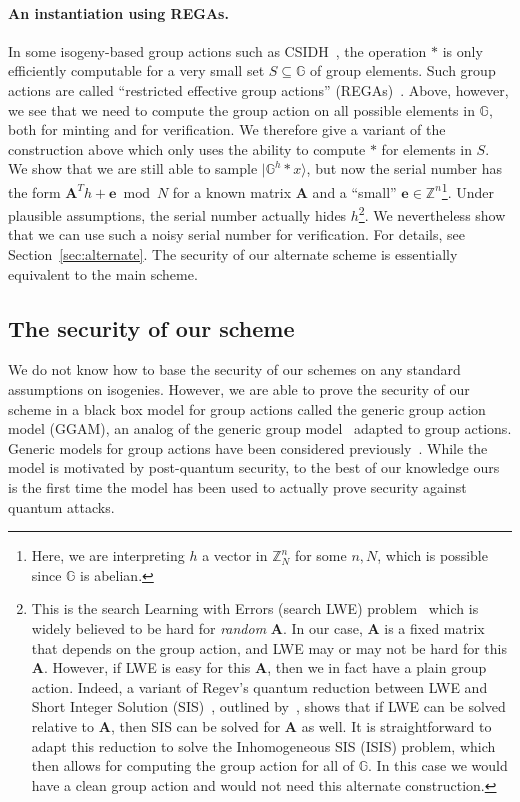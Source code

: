 \documentclass{article}\usepackage[a4paper,margin=20mm]{geometry}
\numberwithin{theorem}{section}
\numberwithin{equation}{section}
\newcommand{\Z}{\mathbb{Z}}
\newcommand{\G}{\mathbb{G}}
\newcommand{\ev}{{\mathbf{e}}}
\newcommand{\Am}{{\mathbf{A}}}
\begin{document}
\paragraph{An instantiation using REGAs.} In some isogeny-based group actions such as CSIDH~\cite{AC:CLMPR18}, the operation $*$ is only efficiently computable for a very small set $S\subseteq\G$ of group elements. Such group actions are called ``restricted effective group actions'' (REGAs)~\cite{AC:ADMP20}. Above, however, we see that we need to compute the group action on all possible elements in $\G$, both for minting and for verification. We therefore give a variant of the construction above which only uses the ability to compute $*$ for elements in $S$. We show that we are still able to sample $|\G^h*x\rangle$, but now the serial number has the form $\Am^T h+\ev\bmod N$ for a known matrix $\Am$ and a ``small'' $\ev\in\Z^n$\enspace\footnote{Here, we are interpreting $h$ a vector in $\Z_N^n$ for some $n,N$, which is possible since $\G$ is abelian.}. Under plausible assumptions, the serial number actually hides $h$\enspace\footnote{This is the search Learning with Errors (search LWE) problem~\cite{DBLP:journals/jacm/Regev09} which is widely believed to be hard for \emph{random} $\Am$. In our case, $\Am$ is a fixed matrix that depends on the group action, and LWE may or may not be hard for this $\Am$. However, if LWE is easy for this $\Am$, then we in fact have a plain group action. Indeed, a variant of Regev's quantum reduction between LWE and Short Integer Solution (SIS)~\cite{DBLP:journals/jacm/Regev09}, outlined by~\cite{DBLP:journals/joc/Zhandry21}, shows that if LWE can be solved relative to $\Am$, then SIS can be solved for $\Am$ as well. It is straightforward to adapt this reduction to solve the Inhomogeneous SIS (ISIS) problem, which then allows for computing the group action for all of $\G$. In this case we would have a clean group action and would not need this alternate construction.}. We nevertheless show that we can use such a noisy serial number for verification. For details, see Section~\ref{sec:alternate}. The security of our alternate scheme is essentially equivalent to the main scheme.



\subsection{The security of our scheme}\label{sec:introsec}

We do not know how to base the security of our schemes on any standard assumptions on isogenies. However, we are able to prove the security of our scheme in a black box model for group actions called the generic group action model (GGAM), an analog of the generic group model~\cite{EC:Shoup97,IMA:Maurer05} adapted to group actions. Generic models for group actions have been considered previously~\cite{DBLP:journals/joc/MontgomeryZ24,EC:BonGuaZha23,EPRINT:OrsZan23,PKC:DHKKLR23}. While the model is motivated by post-quantum security, to the best of our knowledge ours is the first time the model has been used to actually prove security against quantum attacks.
\end{document}
